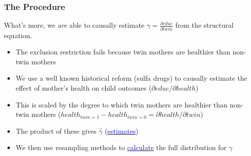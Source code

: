 \documentclass[9pt,letterpaper,subeqn]{beamer}
\begin{document}


\begin{frame}[label=gammaDiscuss]
  \frametitle{The Procedure}
  What's more, we \emph{are} able to causally estimate $\gamma=\frac{\partial educ}{\partial twin}$ from the structural equation.
  \vspace{4mm}
  \begin{itemize}
  \item The exclusion restriction fails because twin mothers are healthier than non-twin mothers
  \item We use a well known historical reform (sulfa drugs) to causally estimate the effect of mother's
    health on child outcomes ($\partial educ/\partial health$)
  \item This is scaled by the degree to which twin mothers are healthier than non-twin mothers
    ($health_{twin=1}-health_{twin=0}=\partial health/\partial twin$)
  \item The product of these gives $\hat\gamma$ (\hyperlink{gammaEst}{\textcolor{blue}{estimates}})
  \item We then use resampling methods to \hyperlink{gammaResamp}{\textcolor{blue}{calculate}} the full distribution for $\gamma$
  \end{itemize}
\end{frame}

\end{document}
